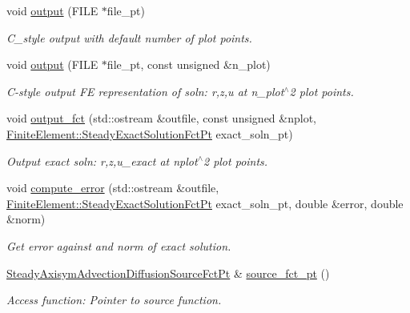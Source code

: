 \begin{DoxyCompactItemize}
void \hyperlink{classoomph_1_1SteadyAxisymAdvectionDiffusionEquations_a8d3b38d7db43bf626f2a57d785ab666f}{output} (F\+I\+LE $\ast$file\+\_\+pt)
\begin{DoxyCompactList}\small\item\em C\+\_\+style output with default number of plot points. \end{DoxyCompactList}\item 
void \hyperlink{classoomph_1_1SteadyAxisymAdvectionDiffusionEquations_a73bafda6b2fe21fff87952630f86aa31}{output} (F\+I\+LE $\ast$file\+\_\+pt, const unsigned \&n\+\_\+plot)
\begin{DoxyCompactList}\small\item\em C-\/style output FE representation of soln\+: r,z,u at n\+\_\+plot$^\wedge$2 plot points. \end{DoxyCompactList}\item 
void \hyperlink{classoomph_1_1SteadyAxisymAdvectionDiffusionEquations_a444263cb79d63da6bd1e7b47f9c60c72}{output\+\_\+fct} (std\+::ostream \&outfile, const unsigned \&nplot, \hyperlink{classoomph_1_1FiniteElement_a690fd33af26cc3e84f39bba6d5a85202}{Finite\+Element\+::\+Steady\+Exact\+Solution\+Fct\+Pt} exact\+\_\+soln\+\_\+pt)
\begin{DoxyCompactList}\small\item\em Output exact soln\+: r,z,u\+\_\+exact at nplot$^\wedge$2 plot points. \end{DoxyCompactList}\item 
void \hyperlink{classoomph_1_1SteadyAxisymAdvectionDiffusionEquations_a29e7e201c998ddc00999e5bda55741b1}{compute\+\_\+error} (std\+::ostream \&outfile, \hyperlink{classoomph_1_1FiniteElement_a690fd33af26cc3e84f39bba6d5a85202}{Finite\+Element\+::\+Steady\+Exact\+Solution\+Fct\+Pt} exact\+\_\+soln\+\_\+pt, double \&error, double \&norm)
\begin{DoxyCompactList}\small\item\em Get error against and norm of exact solution. \end{DoxyCompactList}\item 
\hyperlink{classoomph_1_1SteadyAxisymAdvectionDiffusionEquations_a1a8121ed2ce92dc69aa85c71975489d0}{Steady\+Axisym\+Advection\+Diffusion\+Source\+Fct\+Pt} \& \hyperlink{classoomph_1_1SteadyAxisymAdvectionDiffusionEquations_a26824483f165925c3879548846400a9e}{source\+\_\+fct\+\_\+pt} ()
\begin{DoxyCompactList}\small\item\em Access function\+: Pointer to source function. \end{DoxyCompactList}\item 

\end{DoxyCompactItemize}
